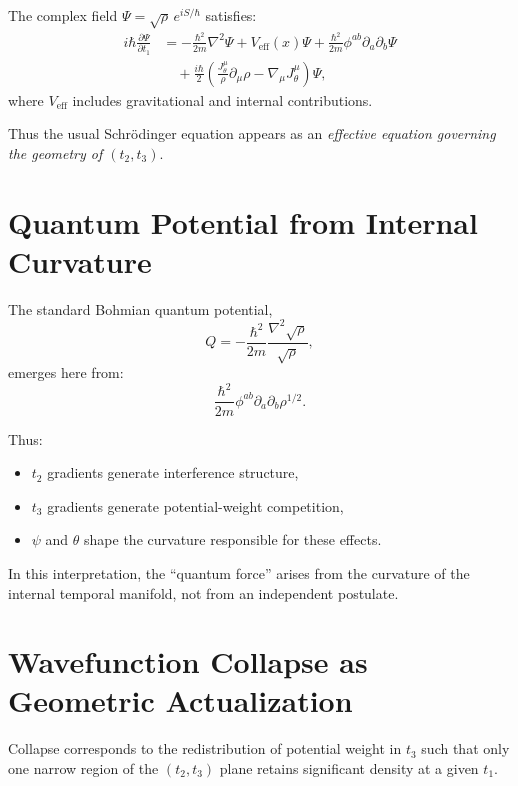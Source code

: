 \documentclass[12pt]{article}
\begin{document}
\begin{theorem}
The complex field \(\Psi=\sqrt{\rho}\,e^{iS/\hbar}\) satisfies:
\begin{align}
i\hbar \frac{\partial\Psi}{\partial t_1}
&=
-\frac{\hbar^2}{2m}\nabla^2\Psi
+ V_{\mathrm{eff}}(x)\Psi
+ \frac{\hbar^2}{2m}\phi^{ab}\partial_a\partial_b\Psi
\nonumber\\
&\quad
+ \frac{i\hbar}{2}
\left(
\frac{J^\mu_\theta}{\rho}\partial_\mu\rho
-
\nabla_\mu J^\mu_\theta
\right)\Psi,
\label{eq:schrodinger-generalized}
\end{align}
where \(V_{\mathrm{eff}}\) includes gravitational and internal contributions.
\end{theorem}

Thus the usual Schrödinger equation appears as an \emph{effective equation
governing the geometry of \((t_2,t_3)\)}.


\newpage
\section{Quantum Potential from Internal Curvature}

The standard Bohmian quantum potential,
\[
Q = -\frac{\hbar^2}{2m}\frac{\nabla^2\sqrt{\rho}}{\sqrt{\rho}},
\]
emerges here from:
\[
\frac{\hbar^2}{2m}\phi^{ab}\partial_a\partial_b \rho^{1/2}.
\]

Thus:
\begin{itemize}
\item \(t_2\) gradients generate interference structure,
\item \(t_3\) gradients generate potential-weight competition,
\item \(\psi\) and \(\theta\) shape the curvature responsible for these effects.
\end{itemize}

In this interpretation, the “quantum force” arises from the curvature of the
internal temporal manifold, not from an independent postulate.


\newpage
\section{Wavefunction Collapse as Geometric Actualization}

Collapse corresponds to the redistribution of potential weight in \(t_3\) such
that only one narrow region of the \((t_2,t_3)\) plane retains significant
density at a given \(t_1\).
\end{document}

